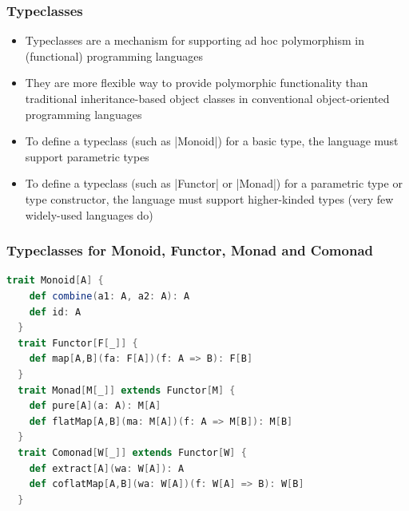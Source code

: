 \documentclass[mathserif,handout]{beamer}
\begin{document}
\begin{frame}[fragile]
  \frametitle{Typeclasses}
  \begin{itemize}
  \item \alert{Typeclasses} are a mechanism for supporting \alert{ad hoc polymorphism} in (functional) programming languages
  \item They are more flexible way to provide polymorphic functionality than traditional inheritance-based object classes in conventional object-oriented programming languages
  \item To define a typeclass (such as |Monoid|) for a basic type, the language must support \alert{parametric types}
  \item To define a typeclass (such as |Functor| or |Monad|) for a parametric type or type constructor, the language must support \alert{higher-kinded types} (very few widely-used languages do)
  \end{itemize}
\end{frame}

\begin{frame}[fragile]
  \frametitle{Typeclasses for Monoid, Functor, Monad and Comonad}
  \begin{lstlisting}[language=scala]
  trait Monoid[A] {
    def combine(a1: A, a2: A): A
    def id: A
  }
  trait Functor[F[_]] {
    def map[A,B](fa: F[A])(f: A => B): F[B]
  }
  trait Monad[M[_]] extends Functor[M] {
    def pure[A](a: A): M[A]
    def flatMap[A,B](ma: M[A])(f: A => M[B]): M[B]
  }
  trait Comonad[W[_]] extends Functor[W] {
    def extract[A](wa: W[A]): A
    def coflatMap[A,B](wa: W[A])(f: W[A] => B): W[B] 
  }
\end{lstlisting}
\end{frame}
\end{document}
